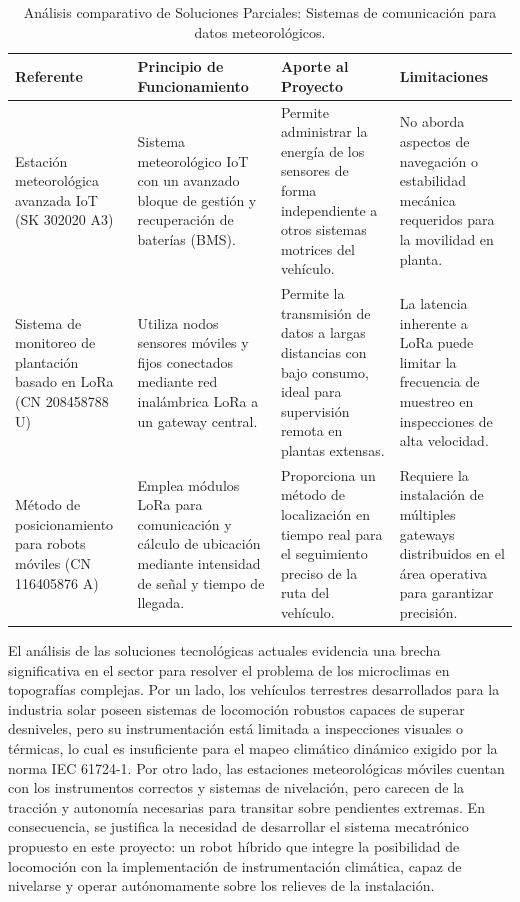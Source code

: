 \documentclass[../../General.tex]{subfiles}
\begin{document}
%
%
\begin{table}[H]
	\centering
	\footnotesize
	\caption{Análisis comparativo de Soluciones Parciales: Sistemas de comunicación para datos meteorológicos.}
	\label{tab:estado_arte_comunicacion}
	\begin{tabularx}{\textwidth}{|p{3.5cm}|>{\raggedright\arraybackslash}X|>{\raggedright\arraybackslash}X|>{\raggedright\arraybackslash}X|}
		\hline
		\rowcolor[HTML]{D9E1F2} 
		\textbf{Referente} & \textbf{Principio de Funcionamiento} & \textbf{Aporte al Proyecto} & \textbf{Limitaciones} \\ \hline
		Estación meteorológica avanzada IoT (SK 302020 A3) & Sistema meteorológico IoT con un avanzado bloque de gestión y recuperación de baterías (BMS). & Permite administrar la energía de los sensores de forma independiente a otros sistemas motrices del vehículo. & No aborda aspectos de navegación o estabilidad mecánica requeridos para la movilidad en planta. \\ \hline
		Sistema de monitoreo de plantación basado en LoRa (CN 208458788 U) & Utiliza nodos sensores móviles y fijos conectados mediante red inalámbrica LoRa a un gateway central. & Permite la transmisión de datos a largas distancias con bajo consumo, ideal para supervisión remota en plantas extensas. & La latencia inherente a LoRa puede limitar la frecuencia de muestreo en inspecciones de alta velocidad. \\ \hline
		Método de posicionamiento para robots móviles (CN 116405876 A) & Emplea módulos LoRa para comunicación y cálculo de ubicación mediante intensidad de señal y tiempo de llegada. & Proporciona un método de localización en tiempo real para el seguimiento preciso de la ruta del vehículo. & Requiere la instalación de múltiples gateways distribuidos en el área operativa para garantizar precisión. \\ \hline
	\end{tabularx}
\end{table}

%
%
El análisis de las soluciones tecnológicas actuales evidencia una brecha significativa en el sector para resolver el problema de los microclimas en topografías complejas. Por un lado, los vehículos terrestres desarrollados para la industria solar poseen sistemas de locomoción robustos capaces de superar desniveles, pero su instrumentación está limitada a inspecciones visuales o térmicas, lo cual es insuficiente para el mapeo climático dinámico exigido por la norma IEC 61724-1. Por otro lado, las estaciones meteorológicas móviles cuentan con los instrumentos correctos y sistemas de nivelación, pero carecen de la tracción y autonomía necesarias para transitar sobre pendientes extremas. En consecuencia, se justifica la necesidad de desarrollar el sistema mecatrónico propuesto en este proyecto: un robot híbrido que integre la posibilidad de locomoción con la implementación de instrumentación climática, capaz de nivelarse y operar autónomamente sobre los relieves de la instalación.
\end{document}
